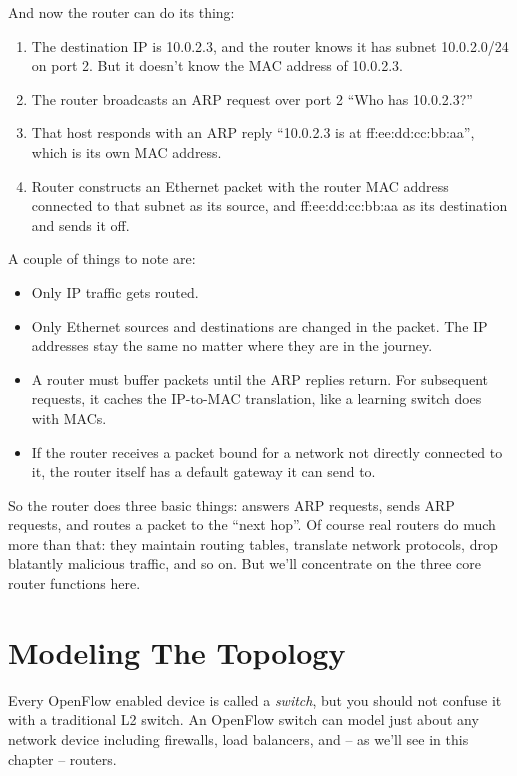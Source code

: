 And now the router can do its thing:

\begin{enumerate}
\item The destination IP is 10.0.2.3, and the router knows it has subnet 10.0.2.0/24
on port 2.  But it doesn't know the MAC address of 10.0.2.3.
\item The router broadcasts an ARP request over port 2 ``Who has 10.0.2.3?''
\item That host responds with an ARP reply ``10.0.2.3 is at ff:ee:dd:cc:bb:aa'', which is its 
own MAC address.
\item Router constructs an Ethernet packet with the router MAC address connected to that
subnet as its source,
and ff:ee:dd:cc:bb:aa as its destination and sends it off.
\end{enumerate}

A couple of things to note are:

\begin{itemize}
\item Only IP traffic gets routed.  
\item Only Ethernet sources and destinations are changed in the packet.  The IP addresses
stay the same no matter where they are in the journey.
\item A router must buffer packets until the ARP replies return.  For subsequent requests, it caches the
IP-to-MAC translation, like a learning switch does with MACs.
\item If the router receives a packet bound for a network not directly connected to it, the router
itself has a default gateway it can send to.  
\end{itemize}

So the router does three basic things: answers ARP requests, sends ARP requests, and routes
a packet to the ``next hop''.  Of course real routers do much more than that: they maintain routing tables,
translate network protocols, drop blatantly malicious traffic, and so on.  But we'll concentrate 
on the three core router functions here.

\section{Modeling The Topology}
\label{routing:topo}

Every OpenFlow enabled device is called a \emph{switch}, but you should not confuse it
with a traditional L2 switch.  An OpenFlow switch can model just about any network device
including firewalls, load balancers, and -- as we'll see in this chapter -- routers.  

